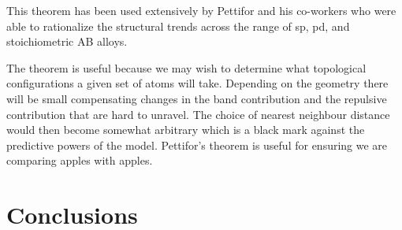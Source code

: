 This theorem has been used extensively by Pettifor and his co-workers who were able to 
rationalize the structural trends across the range of sp\cite{cressoni91}, pd\cite{pettifor86b}, 
and stoichiometric AB alloys\cite{bieber81,pettifor86a}.

The theorem is useful because we may wish to determine what topological configurations a given set of atoms
will take. Depending on the geometry there will be small compensating changes in 
the band contribution and the repulsive contribution that are hard to
unravel. The choice of nearest neighbour distance would then become
somewhat arbitrary which is a black mark against the predictive powers of
the model. Pettifor's theorem is useful for ensuring we are comparing apples with apples.


\section{Conclusions}


